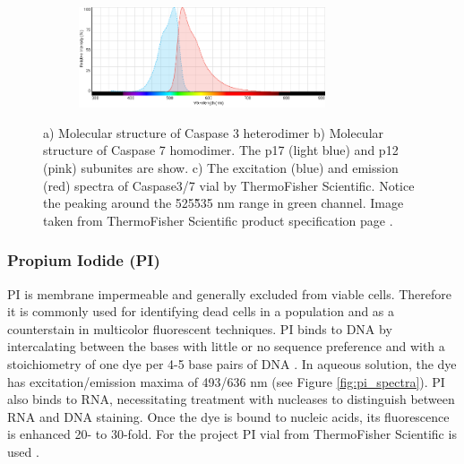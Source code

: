 \documentclass[pdftex,12pt,a4paper]{report}
\begin{document}
\begin{figure}[H]
\centering

\begin{subfigure}{\textwidth}
  \centering
  \includegraphics[width=0.8\textwidth]{images/caspase37_spectra}
  \caption{}
  \label{fig:caspase_spectra}
\end{subfigure}%

\caption{a) Molecular structure of Caspase 3 heterodimer b) Molecular structure of Caspase 7 homodimer. The p17 (light blue) and p12 (pink) subunites are show. c) The excitation (blue) and emission (red) spectra of Caspase3/7 vial by ThermoFisher Scientific. Notice the peaking around the 525\~535 nm range in green channel. Image taken from ThermoFisher Scientific product specification page \cite{thermofisher2018casp}.}

\label{fig:caspase_stain}
\end{figure}

\subsubsection*{Propium Iodide (PI)}

PI is membrane impermeable and generally excluded from viable cells. Therefore it is commonly used for identifying dead cells in a population and as a counterstain in multicolor fluorescent techniques. PI binds to DNA by intercalating between the bases with little or no sequence preference and with a stoichiometry of one dye per 4-5 base pairs of DNA \cite{suzuki1997dna}.  In aqueous solution, the dye has excitation/emission maxima of 493/636 nm (see Figure \ref{fig:pi_spectra}). PI also binds to RNA, necessitating treatment with nucleases to distinguish between RNA and DNA staining. Once the dye is bound to nucleic acids, its fluorescence is enhanced 20- to 30-fold. For the project PI vial from ThermoFisher Scientific is used \cite{thermofisher2018pi}.
\end{document}
